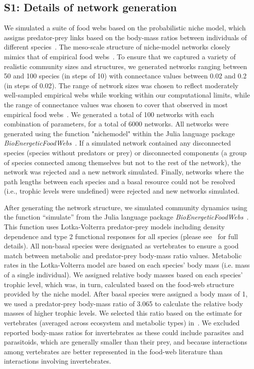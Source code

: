 \documentclass[12pt]{article}
\begin{document}
\clearpage
\begin{spacing}{2.0}
\linenumbers
\section*{S1: Details of network generation}

	We simulated a suite of food webs based on the probabilistic niche model, which assigns predator-prey links based on the body-mass ratios between individuals of different species~\citep{Williams2000,Delmas2017}. The meso-scale structure of niche-model networks closely mimics that of empirical food webs~\citep{Stouffer2007}. To ensure that we captured a variety of realistic community sizes and structures, we generated networks ranging between 50 and 100 species (in steps of 10) with connectance values between 0.02 and 0.2 (in steps of 0.02). The range of network sizes was chosen to reflect moderately well-sampled empirical webs while working within our computational limits, while the range of connectance values was chosen to cover that observed in most empirical food webs~\citep{Dunne2002e}. We generated a total of 100 networks with each combination of parameters, for a total of 6000 networks. All networks were generated using the function "nichemodel" within the Julia language package \emph{BioEnergeticFoodWebs}~\citep{bioenergeticfw,Delmas2017}. If a simulated network contained any disconnected species (species without predators or prey) or disconnected components (a group of species connected among themselves but not to the rest of the network), the network was rejected and a new network simulated. Finally, networks where the path lengths between each species and a basal resource could not be resolved (i.e., trophic levels were undefined) were rejected and new networks simulated.


	After generating the network structure, we simulated community dynamics using the function ``simulate'' from the Julia language package \emph{BioEnergeticFoodWebs}~\citep{bioenergeticfw,Delmas2017}. This function uses Lotka-Volterra predator-prey models including density dependence and type 2 functional responses for all species (please see~\citet{Delmas2017} for full details).
	All non-basal species were designated as vertebrates to ensure a good match between metabolic and predator-prey body-mass ratio values. Metabolic rates in the Lotka-Volterra model are based on each species' body mass (i.e. mass of a single individual). We assigned relative body masses based on each species' trophic level, which was, in turn, calculated based on the food-web structure provided by the niche model. After basal species were assigned a body mass of 1, we used a predator-prey body-mass ratio of 3.065 to calculate the relative body masses of higher trophic levels. We selected this ratio based on the estimate for vertebrates (averaged across ecosystem and metabolic types) in~\citet{Brose2006}. We excluded reported body-mass ratios for invertebrates as these could include parasites and parasitoids, which are generally smaller than their prey, and because interactions among vertebrates are better represented in the food-web literature than interactions involving invertebrates.
	

\end{spacing}
\end{document}
